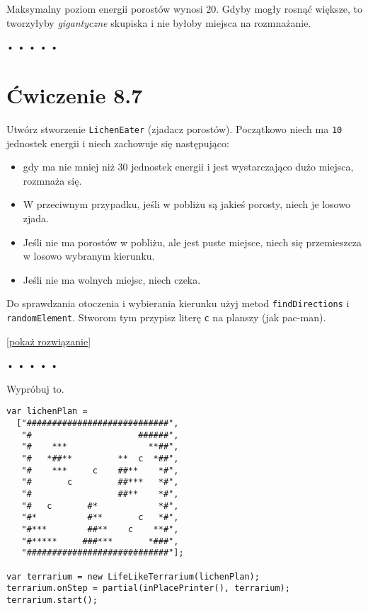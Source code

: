 Maksymalny poziom energii porostów wynosi 20. Gdyby mogły rosnąć większe, to tworzyłyby \emph{gigantyczne} skupiska i nie byłoby miejsca na rozmnażanie.



\begin{center}
• • • • •
\end{center}

  
\section*{Ćwiczenie 8.7}
\label{sec:8.7}
  
    
Utwórz stworzenie \texttt{LichenEater} (zjadacz porostów). Początkowo niech ma \texttt{10} jednostek energii i niech zachowuje się następująco:

    \begin{itemize}
      \item gdy ma nie mniej niż 30 jednostek energii i jest wystarczająco dużo miejsca, rozmnaża się.
      \item W przeciwnym przypadku, jeśli w pobliżu są jakieś porosty, niech je losowo zjada.
      \item Jeśli nie ma porostów w pobliżu, ale jest puste miejsce, niech się przemieszcza w losowo wybranym kierunku.
      \item Jeśli nie ma wolnych miejsc, niech czeka.
    \end{itemize}
    
Do sprawdzania otoczenia i wybierania kierunku użyj metod \texttt{findDirections} i \texttt{randomElement}. Stworom tym przypisz literę \texttt{c} na planszy (jak pac-man).

  
[\hyperref[sol:8.7]{pokaż rozwiązanie}]
  


\begin{center}
• • • • •
\end{center}

  
Wypróbuj to.

  
\begin{verbatim} 
var lichenPlan =
  ["############################",
   "#                     ######",
   "#    ***                **##",
   "#   *##**         **  c  *##",
   "#    ***     c    ##**    *#",
   "#       c         ##***   *#",
   "#                 ##**    *#",
   "#   c       #*            *#",
   "#*          #**       c   *#",
   "#***        ##**    c    **#",
   "#*****     ###***       *###",
   "############################"];

var terrarium = new LifeLikeTerrarium(lichenPlan);
terrarium.onStep = partial(inPlacePrinter(), terrarium);
terrarium.start();
 \end{verbatim}
  
